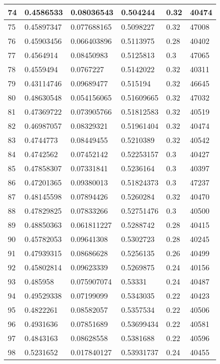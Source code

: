 \begin{longtable}{|l|l|l|l|l|l|}
74 & 0.4586533 & 0.08036543 & 0.504244 & 0.32 & 40474 \\ \hline 
75 & 0.45897347 & 0.077688165 & 0.5098227 & 0.32 & 47008 \\ \hline 
76 & 0.45903456 & 0.066403896 & 0.5113975 & 0.28 & 40402 \\ \hline 
77 & 0.4564914 & 0.08450983 & 0.5125813 & 0.3 & 47065 \\ \hline 
78 & 0.4559494 & 0.0767227 & 0.5142022 & 0.32 & 40311 \\ \hline 
79 & 0.43114746 & 0.09689477 & 0.515194 & 0.32 & 46645 \\ \hline 
80 & 0.48630548 & 0.054156065 & 0.51609665 & 0.32 & 47032 \\ \hline 
81 & 0.47369722 & 0.073905766 & 0.51812583 & 0.32 & 40519 \\ \hline 
82 & 0.46987057 & 0.08329321 & 0.51961404 & 0.32 & 40474 \\ \hline 
83 & 0.4744773 & 0.08449455 & 0.5210389 & 0.32 & 40542 \\ \hline 
84 & 0.4742562 & 0.07452142 & 0.52253157 & 0.3 & 40427 \\ \hline 
85 & 0.47858307 & 0.07331841 & 0.5236164 & 0.3 & 40397 \\ \hline 
86 & 0.47201365 & 0.09380013 & 0.51824373 & 0.3 & 47237 \\ \hline 
87 & 0.48145598 & 0.07894426 & 0.5260284 & 0.32 & 40470 \\ \hline 
88 & 0.47829825 & 0.07833266 & 0.52751476 & 0.3 & 40500 \\ \hline 
89 & 0.48850363 & 0.061811227 & 0.5288742 & 0.28 & 40415 \\ \hline 
90 & 0.45782053 & 0.09641308 & 0.5302723 & 0.28 & 40245 \\ \hline 
91 & 0.47939315 & 0.08686628 & 0.5256135 & 0.26 & 40499 \\ \hline 
92 & 0.45802814 & 0.09623339 & 0.5269875 & 0.24 & 40156 \\ \hline 
93 & 0.485958 & 0.075907074 & 0.53331 & 0.24 & 40487 \\ \hline 
94 & 0.49529338 & 0.07199099 & 0.5343035 & 0.22 & 40423 \\ \hline 
95 & 0.4822261 & 0.08582057 & 0.5357534 & 0.22 & 40506 \\ \hline 
96 & 0.4931636 & 0.07851689 & 0.53699434 & 0.22 & 40581 \\ \hline 
97 & 0.4843163 & 0.08628558 & 0.5381688 & 0.22 & 40596 \\ \hline 
98 & 0.5231652 & 0.017840127 & 0.53931737 & 0.24 & 40455 \\ \hline 

\end{longtable}
